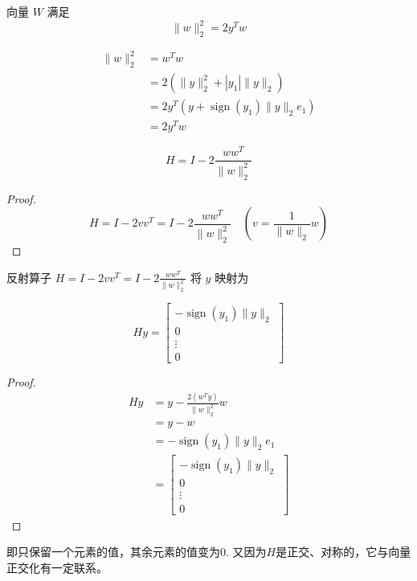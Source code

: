 \begin{theorem}
    向量 $ W $ 满足 $$ \|w\|_{2}^{2}=2 y^{T} w $$
\end{theorem}

$$
\begin{aligned}
    \|w\|_{2}^{2}&=w^{T} w\\
    &=2\left(\|y\|_{2}^{2}+\left|y_{1}\right|\|y\|_{2}\right)\\
    &=2 y^{T}\left(y+\operatorname{sign}\left(y_{1}\right)\|y\|_{2} e_{1}\right)\\
    &=2 y^{T} w 
\end{aligned}
$$

\begin{theorem}
    $$ H=I-2 \frac{w w^{T}}{\|w\|_{2}^{2}} $$
\end{theorem}

\begin{proof}
    $$ H=I-2 v v^{T}=I-2 \frac{w w^{T}}{\|w\|_{2}^{2}} \quad(v=\frac{1}{\|w\|_{2}} w) $$
\end{proof}

\begin{theorem}
    反射算子 $ H=I-2 v v^{T}=I-2 \frac{w w^{T}}{\|w\|_{2}^{2}} $ 将 $ y $ 映射为

   $$ H y = \left[\begin{array}{c}-\operatorname{sign}\left(y_{1}\right)\|y\|_{2} \\ 0 \\ \vdots \\ 0\end{array}\right] $$
\end{theorem}


\begin{proof}
    $$ 
\begin{aligned}
    H y&=y-\frac{2\left(w^{T} y\right)}{\|w\|_{2}^{2}} w\\
    &=y-w\\
    &=-\operatorname{sign}\left(y_{1}\right)\|y\|_{2} e_{1}\\
    &=\left[\begin{array}{c}-\operatorname{sign}\left(y_{1}\right)\|y\|_{2} \\ 0 \\ \vdots \\ 0\end{array}\right]
\end{aligned}
 $$
\end{proof}

即只保留一个元素的值，其余元素的值变为0. 又因为$H$是正交、对称的，它与向量正交化有一定联系。

